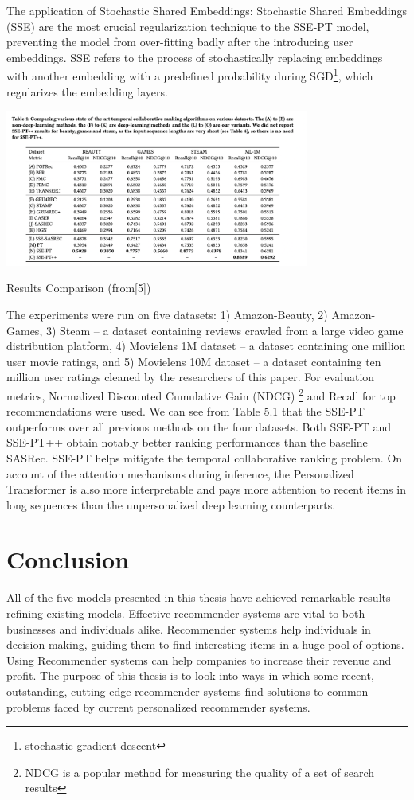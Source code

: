 The application of Stochastic Shared Embeddings: Stochastic Shared Embeddings (SSE) are the most crucial regularization technique to the SSE-PT model, preventing the model from over-fitting badly after the introducing user embeddings. SSE refers to the process of 
stochastically replacing embeddings with another embedding with
a predefined probability during SGD\footnote{stochastic gradient descent}, which regularizes the embedding layers. 
\begin{table}[ht!]
    \centering
    \includegraphics[width=100mm]{results_Transformer.png}
    \caption{Results Comparison (from[5])
    \label{overflow}}
\end{table}
The experiments were run on five datasets: 1) Amazon-Beauty, 2) Amazon-Games, 3) Steam -- a dataset containing reviews crawled from a large video game distribution platform, 4) Movielens 1M dataset -- a dataset containing one million user movie ratings, and 5) Movielens 10M dataset -- a dataset containing ten million user ratings cleaned by the researchers of this paper. For evaluation metrics, Normalized Discounted Cumulative Gain (NDCG) \footnote{NDCG is a popular method for measuring the quality of a set of search results} and Recall for top recommendations were used. We can see from Table 5.1 that the SSE-PT outperforms over all previous methods on the four datasets. Both SSE-PT and SSE-PT++ obtain notably better ranking performances than the baseline SASRec. SSE-PT helps mitigate the temporal collaborative ranking problem. On account of the attention mechanisms
during inference, the Personalized Transformer is also more interpretable and pays more attention to recent items in long sequences than the unpersonalized deep learning counterparts.

\chapter{ Conclusion}

All of the five models presented in this thesis have achieved remarkable results refining existing models. Effective recommender systems are vital to both businesses and individuals alike. Recommender systems help individuals in decision-making, guiding them to find interesting items in a huge pool of options. Using Recommender systems can help companies to increase their revenue and profit. The purpose of this thesis is to look into ways in which some recent, outstanding, cutting-edge recommender systems find solutions to common problems faced by current personalized recommender systems.

